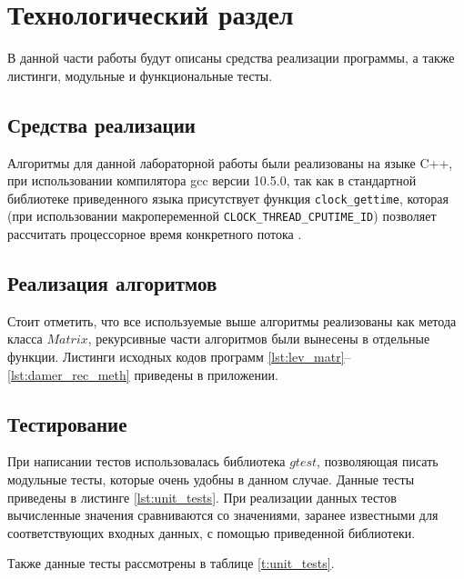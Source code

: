\chapter{Технологический раздел}

В данной части работы будут описаны средства реализации программы, а также листинги, модульные и функциональные тесты.

\section{Средства реализации}
Алгоритмы для данной лабораторной работы были реализованы на языке C++, при использовании компилятора gcc версии 10.5.0, так как в стандартной библиотеке приведенного языка
присутствует функция \texttt{clock\_gettime}, которая (при использовании макропеременной \texttt{CLOCK\_THREAD\_CPUTIME\_ID}) позволяет рассчитать процессорное время конкретного потока \cite{cpp-time}.



\section{Реализация алгоритмов}

Стоит отметить, что все используемые выше алгоритмы реализованы как метода класса $Matrix$, рекурсивные части алгоритмов были вынесены в отдельные функции.
Листинги исходных кодов программ  \ref{lst:lev_matr}--\ref{lst:damer_rec_meth} приведены в приложении.

\section{Тестирование}
При написании тестов использовалась библиотека $gtest$, позволяющая писать модульные тесты, которые очень удобны 
в данном случае. Данные тесты приведены в листинге  \ref{lst:unit_tests}. При реализации данных тестов вычисленные значения
сравниваются со значениями, заранее известными для соответствующих входных данных, с помощью приведенной библиотеки.


Также данные тесты рассмотрены в таблице \ref{t:unit_tests}.

